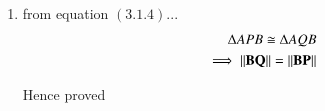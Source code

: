 \begin{enumerate}[label=\thesection.\arabic*.,ref=\thesection.\theenumi]
	
\item
from equation $\left(3.1.4\right)$...
\begin{align}
\Delta APB \cong \Delta AQB
\\
\implies\left\lVert\mathbf{BQ}\right\rVert = \left\lVert\mathbf{BP}\right\rVert
\end{align}


Hence proved

\end{enumerate}
